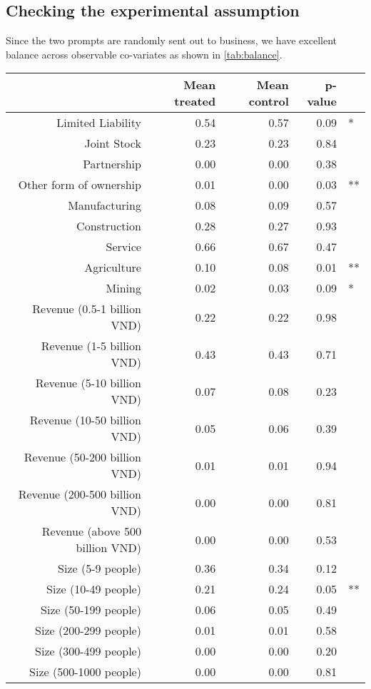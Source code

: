 \subsection{Checking the experimental assumption}

Since the two prompts are randomly sent out to business, we have excellent balance across observable co-variates as shown in \autoref{tab:balance}.

\begin{table}[H]
\centering
\begin{tabular}{rrrrl}
  \hline
 & Mean treated & Mean control & p-value &   \\ 
  \hline
Limited Liability & 0.54 & 0.57 & 0.09 & * \\ 
  Joint Stock & 0.23 & 0.23 & 0.84 &  \\ 
  Partnership & 0.00 & 0.00 & 0.38 &  \\ 
  Other form of ownership & 0.01 & 0.00 & 0.03 & ** \\ 
  Manufacturing & 0.08 & 0.09 & 0.57 &  \\ 
  Construction & 0.28 & 0.27 & 0.93 &  \\ 
  Service & 0.66 & 0.67 & 0.47 &  \\ 
  Agriculture & 0.10 & 0.08 & 0.01 & ** \\ 
  Mining & 0.02 & 0.03 & 0.09 & * \\ 
  Revenue (0.5-1 billion VND) & 0.22 & 0.22 & 0.98 &  \\ 
  Revenue (1-5 billion VND) & 0.43 & 0.43 & 0.71 &  \\ 
  Revenue (5-10 billion VND) & 0.07 & 0.08 & 0.23 &  \\ 
  Revenue (10-50 billion VND) & 0.05 & 0.06 & 0.39 &  \\ 
  Revenue (50-200 billion VND) & 0.01 & 0.01 & 0.94 &  \\ 
  Revenue (200-500 billion VND) & 0.00 & 0.00 & 0.81 &  \\ 
  Revenue (above 500 billion VND) & 0.00 & 0.00 & 0.53 &  \\ 
  Size (5-9 people) & 0.36 & 0.34 & 0.12 &  \\ 
  Size (10-49 people) & 0.21 & 0.24 & 0.05 & ** \\ 
  Size (50-199 people) & 0.06 & 0.05 & 0.49 &  \\ 
  Size (200-299 people) & 0.01 & 0.01 & 0.58 &  \\ 
  Size (300-499 people) & 0.00 & 0.00 & 0.20 &  \\ 
  Size (500-1000 people) & 0.00 & 0.00 & 0.81 &  \\ 

\end{tabular}
\end{table}

